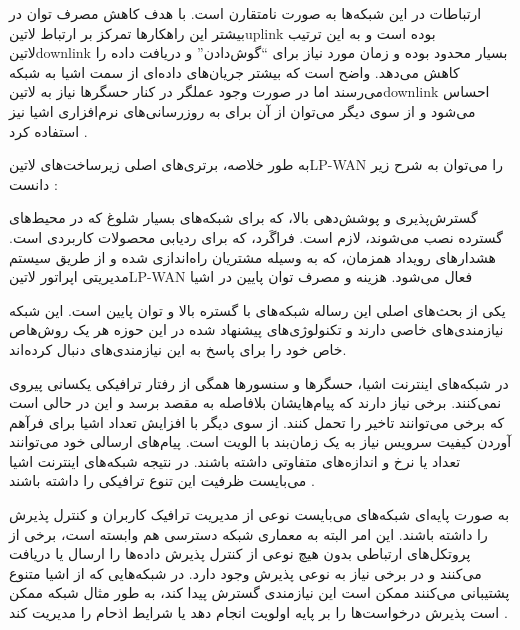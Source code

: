 ارتباطات در این شبکه‌ها به صورت نامتقارن است. با هدف کاهش مصرف توان در بیشتر این راهکارها تمرکز بر ارتباط ‌لاتین{uplink}
بوده است و به این ترتیب ‌لاتین{downlink} بسیار محدود بوده و زمان مورد نیاز برای ``گوش‌دادن'' و دریافت داده را کاهش می‌دهد.
واضح است که بیشتر جریان‌های داده‌ای از سمت اشیا به شبکه می‌رسند اما در صورت وجود عملگر در کنار حسگرها نیاز به ‌لاتین{downlink}
احساس می‌شود و از سوی دیگر می‌توان از آن برای به روزرسانی‌های نرم‌افزاری اشیا نیز استفاده کرد
.

به طور خلاصه، برتری‌های اصلی زیرساخت‌های ‌لاتین{LP-WAN} را می‌توان به شرح زیر دانست :

 گسترش‌پذیری و پوشش‌دهی بالا، که برای شبکه‌های بسیار شلوغ که در محیط‌های گسترده نصب می‌شوند، لازم است.
 فراگَرد، که برای ردیابی محصولات کاربردی است.
 هشدارهای رویداد همزمان، که به وسیله مشتریان راه‌اندازی شده و از طریق سیستم مدیریتی اپراتور ‌لاتین{LP-WAN} فعال می‌شود.
 هزینه و مصرف توان پایین در اشیا


یکی از بحث‌های اصلی این رساله شبکه‌های با گستره بالا و توان پایین است. این شبکه نیازمندی‌های خاصی دارند و تکنولوژی‌های پیشنهاد شده در این حوزه
هر یک روش‌هاص خاص خود را برای پاسخ به این نیازمندی‌های دنبال کرده‌اند.


در شبکه‌های اینترنت اشیا، حسگرها و سنسورها همگی از رفتار ترافیکی یکسانی پیروی نمی‌کنند. برخی نیاز دارند که پیام‌هایشان بلافاصله به مقصد برسد و این در حالی است که برخی می‌توانند تاخیر را تحمل کنند.
از سوی دیگر با افزایش تعداد اشیا برای فرآهم آوردن کیفیت سرویس نیاز به یک زمان‌بند با الویت است. پیام‌های ارسالی خود می‌توانند تعداد یا نرخ و اندازه‌های متفاوتی داشته باشند.
در نتیجه شبکه‌های اینترنت اشیا می‌بایست ظرفیت این تنوع ترافیکی را داشته باشند
.

به صورت پایه‌ای شبکه‌های می‌بایست نوعی از مدیریت ترافیک کاربران و کنترل پذیرش را داشته باشند.
این امر البته به معماری شبکه دسترسی هم وابسته است، برخی از پروتکل‌های ارتباطی بدون هیچ نوعی از کنترل پذیرش
داده‌ها را ارسال یا دریافت می‌کنند و در برخی نیاز به نوعی پذیرش وجود دارد.
در شبکه‌هایی که از اشیا متنوع پشتیبانی می‌کنند ممکن است این نیازمندی گسترش پیدا کند، به طور مثال
شبکه ممکن است پذیرش درخواست‌ها را بر پایه اولویت انجام دهد یا شرایط اذحام را مدیریت کند
.


